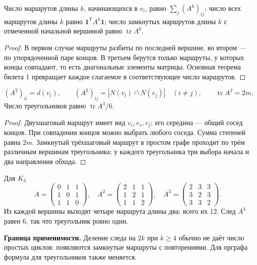 \begin{theorem}
Число маршрутов длины \(k\), начинающихся в \(v_i\), равно
\(\sum_j(A^k)_{ij}\); число всех маршрутов длины \(k\) равно
\(\boldsymbol1^{\mathsf T}A^k\boldsymbol1\); число замкнутых маршрутов
длины \(k\) с отмеченной начальной вершиной равно \(\operatorname{tr}A^k\).
\end{theorem}
\begin{proof}
В первом случае маршруты разбиты по последней вершине, во втором —
по упорядоченной паре концов. В третьем берутся только маршруты,
у которых концы совпадают, то есть диагональные элементы матрицы.
Основная теорема билета 1 превращает каждое слагаемое в соответствующее число маршрутов.
\end{proof}
\begin{cor}
\[
 (A^2)_{ii}=d(v_i),\qquad (A^2)_{ij}=|N(v_i)\cap N(v_j)|\quad(i\ne j),
 \qquad \operatorname{tr}A^2=2m.
\]
Число треугольников равно \(\operatorname{tr}A^3/6\).
\end{cor}
\begin{proof}
Двухшаговый маршрут имеет вид \(v_i,v_s,v_j\); его середина — общий
сосед концов. При совпадении концов можно выбрать любого соседа.
Сумма степеней равна \(2m\). Замкнутый трёхшаговый маршрут в простом
графе проходит по трём различным вершинам треугольника; у каждого
треугольника три выбора начала и два направления обхода.
\end{proof}
\begin{example}[Треугольник]
Для \(K_3\)
\[
 A=\begin{pmatrix}0&1&1\\1&0&1\\1&1&0\end{pmatrix},\quad
 A^2=\begin{pmatrix}2&1&1\\1&2&1\\1&1&2\end{pmatrix},\quad
 A^3=\begin{pmatrix}2&3&3\\3&2&3\\3&3&2\end{pmatrix}.
\]
Из каждой вершины выходят четыре маршрута длины два; всего их 12.
След \(A^3\) равен 6, так что треугольник ровно один.
\end{example}


\textbf{Граница применимости.} Деление следа на \(2k\) при \(k\ge4\)
обычно не даёт число простых циклов: появляются замкнутые маршруты
с повторениями. Для орграфа формула для треугольников также меняется.
